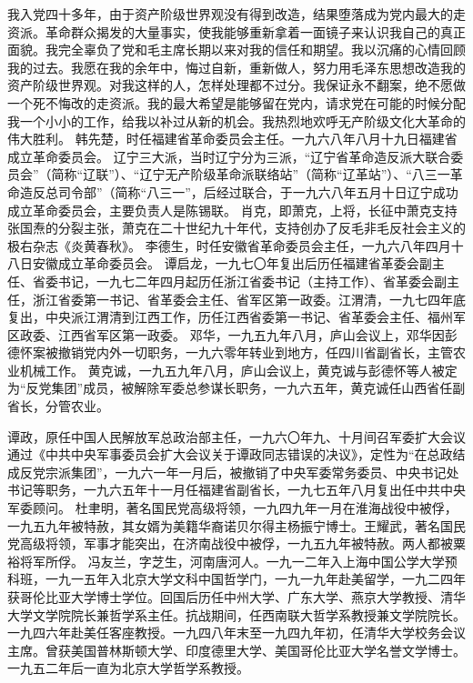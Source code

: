 \begin{maonote}
我入党四十多年，由于资产阶级世界观没有得到改造，结果堕落成为党内最大的走资派。革命群众揭发的大量事实，使我能够重新拿着一面镜子来认识我自己的真正面貌。我完全辜负了党和毛主席长期以来对我的信任和期望。我以沉痛的心情回顾我的过去。我愿在我的余年中，悔过自新，重新做人，努力用毛泽东思想改造我的资产阶级世界观。对我这样的人，怎样处理都不过分。我保证永不翻案，绝不愿做一个死不悔改的走资派。我的最大希望是能够留在党内，请求党在可能的时候分配我一个小小的工作，给我以补过从新的机会。我热烈地欢呼无产阶级文化大革命的伟大胜利。
韩先楚，时任福建省革命委员会主任。一九六八年八月十九日福建省成立革命委员会。
辽宁三大派，当时辽宁分为三派，“辽宁省革命造反派大联合委员会”（简称“辽联”）、“辽宁无产阶级革命派联络站”（简称“辽革站”）、“八三一革命造反总司令部”（简称“八三一”，后经过联合，于一九六八年五月十日辽宁成功成立革命委员会，主要负责人是陈锡联。
肖克，即萧克，上将，长征中萧克支持张国焘的分裂主张，萧克在二十世纪九十年代，支持创办了反毛非毛反社会主义的极右杂志《炎黄春秋》。
李德生，时任安徽省革命委员会主任，一九六八年四月十八日安徽成立革命委员会。
谭启龙，一九七〇年复出后历任福建省革委会副主任、省委书记，一九七二年四月起历任浙江省委书记（主持工作）、省革委会副主任，浙江省委第一书记、省革委会主任、省军区第一政委。江渭清，一九七四年底复出，中央派江渭清到江西工作，历任江西省委第一书记、省革委会主任、福州军区政委、江西省军区第一政委。
邓华，一九五九年八月，庐山会议上，邓华因彭德怀案被撤销党内外一切职务，一九六零年转业到地方，任四川省副省长，主管农业机械工作。
黄克诚，一九五九年八月，庐山会议上，黄克诚与彭德怀等人被定为“反党集团”成员，被解除军委总参谋长职务，一九六五年，黄克诚任山西省任副省长，分管农业。

谭政，原任中国人民解放军总政治部主任，一九六〇年九、十月间召军委扩大会议通过《中共中央军事委员会扩大会议关于谭政同志错误的决议》，定性为“在总政结成反党宗派集团”，一九六一年一月后，被撤销了中央军委常务委员、中央书记处书记等职务，一九六五年十一月任福建省副省长，一九七五年八月复出任中共中央军委顾问。
杜聿明，著名国民党高级将领，一九四九年一月在淮海战役中被俘，一九五九年被特赦，其女婿为美籍华裔诺贝尔得主杨振宁博士。王耀武，著名国民党高级将领，军事才能突出，在济南战役中被俘，一九五九年被特赦。两人都被粟裕将军所俘。
冯友兰，字芝生，河南唐河人。一九一二年入上海中国公学大学预科班，一九一五年入北京大学文科中国哲学门，一九一九年赴美留学，一九二四年获哥伦比亚大学博士学位。回国后历任中州大学、广东大学、燕京大学教授、清华大学文学院院长兼哲学系主任。抗战期间，任西南联大哲学系教授兼文学院院长。一九四六年赴美任客座教授。一九四八年末至一九四九年初，任清华大学校务会议主席。曾获美国普林斯顿大学、印度德里大学、美国哥伦比亚大学名誉文学博士。一九五二年后一直为北京大学哲学系教授。


\end{maonote}
